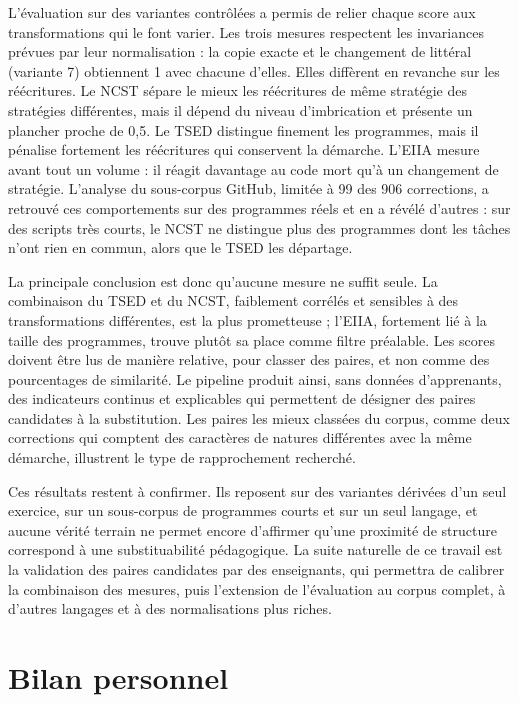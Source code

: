 \documentclass[12pt,a4paper,oneside]{report}
\begin{document}
L'évaluation sur des variantes contrôlées a permis de relier chaque score
aux transformations qui le font varier. Les trois mesures respectent les
invariances prévues par leur normalisation : la copie exacte et le
changement de littéral (variante 7) obtiennent 1 avec chacune d'elles. Elles diffèrent en revanche sur
les réécritures. Le NCST sépare le mieux les réécritures de même stratégie
des stratégies différentes, mais il dépend du niveau d'imbrication et
présente un plancher proche de 0,5. Le TSED distingue finement les
programmes, mais il pénalise fortement les réécritures qui conservent la
démarche. L'EIIA mesure avant tout un volume : il réagit davantage au code
mort qu'à un changement de stratégie. L'analyse du sous-corpus GitHub, limitée
à 99 des 906 corrections, a retrouvé ces comportements sur des programmes
réels et en a révélé d'autres : sur des scripts très courts, le NCST ne distingue plus des programmes
dont les tâches n'ont rien en commun, alors que le TSED les départage.

La principale conclusion est donc qu'aucune mesure ne suffit seule. La
combinaison du TSED et du NCST, faiblement corrélés et sensibles à des
transformations différentes, est la plus prometteuse ; l'EIIA, fortement
lié à la taille des programmes, trouve plutôt sa place comme filtre
préalable. Les scores doivent être lus de manière relative, pour classer
des paires, et non comme des pourcentages de similarité. Le pipeline
produit ainsi, sans données d'apprenants, des indicateurs continus et
explicables qui permettent de désigner des paires candidates à la
substitution. Les paires les mieux classées du corpus,
comme deux corrections qui comptent des caractères de natures différentes
avec la même démarche, illustrent le type de rapprochement recherché.

Ces résultats restent à confirmer. Ils reposent sur des variantes dérivées
d'un seul exercice, sur un sous-corpus de programmes courts et sur un seul
langage, et aucune vérité terrain ne permet encore d'affirmer qu'une
proximité de structure correspond à une substituabilité pédagogique. La
suite naturelle de ce travail est la validation des paires candidates par
des enseignants, qui permettra de calibrer la combinaison des mesures,
puis l'extension de l'évaluation au corpus complet, à d'autres langages et
à des normalisations plus riches.

\section*{Bilan personnel}
\end{document}
